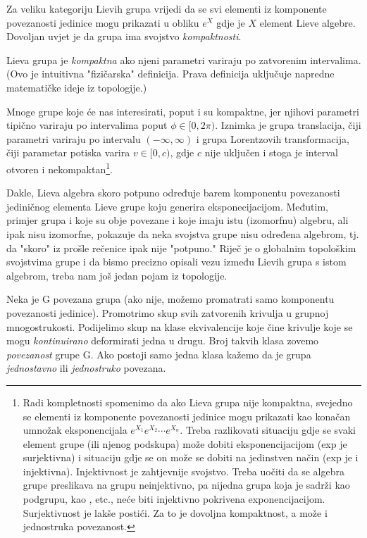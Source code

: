 Za veliku kategoriju Lievih grupa vrijedi da se svi elementi iz 
komponente povezanosti jedinice mogu prikazati u obliku
$e^{X}$ gdje je $X$ element
Lieve algebre. Dovoljan uvjet je da grupa ima svojstvo \emph{kompaktnosti}.
\begin{definicija}[Kompaktnost]
Lieva grupa je \emph{kompaktna} ako njeni parametri variraju po zatvorenim intervalima.
(Ovo je intuitivna "fizičarska" definicija. Prava definicija uključuje napredne
matematičke ideje iz topologije.)
\label{def:kompaktnost}
\end{definicija}
Mnoge grupe koje će nas interesirati, poput
 i  su kompaktne, jer njihovi parametri tipično variraju
po intervalima poput $\phi \in [0, 2\pi)$. Iznimka je
grupa translacija, čiji parametri variraju po intervalu $(-\infty,
\infty)$ i grupa Lorentzovih transformacija, čiji parametar
potiska varira $v \in [0, c)$, gdje $c$ nije uključen i stoga
je interval otvoren i nekompaktan\footnote{Radi
    kompletnosti spomenimo da ako Lieva grupa nije kompaktna, 
    svejedno se elementi iz komponente
povezanosti jedinice mogu prikazati kao konačan umnožak eksponencijala
$e^{X_1} e^{X_2}\cdots e^{X_n}$.
Treba razlikovati situaciju gdje se svaki element
grupe (ili njenog podskupa) može dobiti eksponencijacijom (exp
je surjektivna) i situaciju gdje se on može se dobiti na jedinstven način 
(exp je i injektivna).
Injektivnost je zahtjevnije svojstvo. 
Treba uočiti da se algebra grupe  preslikava na grupu neinjektivno,
pa nijedna grupa koja
je sadrži kao podgrupu, kao ,  etc., neće biti injektivno pokrivena
exponencijacijom. Surjektivnost je lakše postići.
Za to je dovoljna kompaktnost,
a može i jednostruka povezanost.}.


Dakle, Lieva algebra skoro potpuno određuje barem komponentu povezanosti
jediničnog elementa Lieve grupe koju generira eksponecijacijom.
Međutim, primjer grupa  i  koje su obje povezane i koje
imaju istu (izomorfnu) algebru, ali ipak nisu izomorfne, pokazuje
da neka svojstva grupe nisu određena algebrom, tj. da "skoro" iz
prošle rečenice ipak nije "potpuno."
Riječ je o globalnim topološkim svojstvima grupe i
da bismo precizno opisali vezu između Lievih grupa s istom algebrom, treba
nam još jedan pojam iz topologije.
\begin{definicija}
  Neka je G povezana grupa (ako nije, možemo promatrati samo komponentu
povezanosti jedinice). Promotrimo skup svih zatvorenih krivulja u grupnoj 
mnogostrukosti. Podijelimo skup  na klase ekvivalencije koje čine 
krivulje koje se mogu \emph{kontinuirano} deformirati jedna u drugu.
Broj takvih klasa zovemo \emph{povezanost} grupe G. Ako postoji samo
jedna klasa kažemo da je grupa \emph{jednostavno} ili \emph{jednostruko}
povezana.
\end{definicija}

